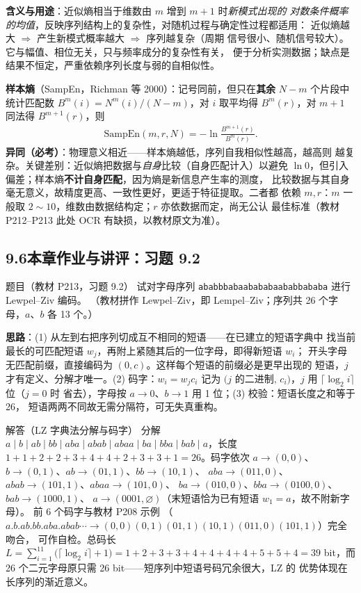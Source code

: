 \textbf{含义与用途}：近似熵相当于维数由 $m$ 增到 $m+1$ 时\emph{新模式出现的
对数条件概率的均值}，反映序列结构上的复杂性，对随机过程与确定性过程都适用：
近似熵越大 $\Rightarrow$ 产生新模式概率越大 $\Rightarrow$ 序列越复杂（周期
信号很小、随机信号较大）。它与幅值、相位无关，只与频率成分的复杂性有关，
便于分析实测数据；缺点是结果不恒定，严重依赖序列长度与弱的自相似性。

\textbf{样本熵}（SampEn，Richman 等 2000）：记号同前，但只在\textbf{其余}
$N-m$ 个片段中统计匹配数 $B^{m}(i)=N^{m}(i)/(N-m)$，对 $i$ 取平均得
$B^{m}(r)$，对 $m+1$ 同法得 $B^{m+1}(r)$，则
\begin{align*}
\mathrm{SampEn}(m,r,N)=-\ln\frac{B^{m+1}(r)}{B^{m}(r)} .
\end{align*}
\textbf{异同（必考）}：物理意义相近——样本熵越低，序列自我相似性越高，越高则
越复杂。关键差别：近似熵把数据与\emph{自身}比较（自身匹配计入）以避免
$\ln0$，但引入偏差；样本熵\textbf{不计自身匹配}，因为熵是新信息产生率的测度，
比较数据与其自身毫无意义，故精度更高、一致性更好，更适于特征提取。二者都
依赖 $m,r$：$m$ 一般取 $2\sim10$，维数由数据结构定；$r$ 亦依数据而定，尚无公认
最佳标准（教材 P212--P213 此处 OCR 有缺损，以教材原文为准）。

\subsection{9.6\quad 本章作业与讲评：习题 9.2}

\begin{example}{题目（教材 P213，习题 9.2）}
试对字母序列 \texttt{ababbbabaabababaababbababa} 进行 Lewpel--Ziv 编码。
（教材拼作 Lewpel--Ziv，即 Lempel--Ziv；序列共 26 个字母，$a$、$b$ 各 13 个。）
\end{example}

\textbf{思路}：(1) 从左到右把序列切成互不相同的短语——在已建立的短语字典中
找当前最长的可匹配短语 $w_j$，再附上紧随其后的一位字母，即得新短语 $w_i$；
开头字母无匹配前缀，直接编码为 $(0,c)$。这样每个短语的前缀必是更早出现的
短语，$j$ 才有定义、分解才唯一。(2) 码字：$w_i=w_jc_i$ 记为
$\bigl(j$ 的二进制$,\,c_i\bigr)$，$j$ 用 $\lceil\log_2i\rceil$ 位（$j=0$ 时
省去），字母按 $a\to0$、$b\to1$ 用 1 位；(3) 校验：短语长度之和等于 26，
短语两两不同故无需分隔符，可无失真重构。

\begin{keypoint}{解答（LZ 字典法分解与码字）}
分解 $a\mid b\mid ab\mid bb\mid aba\mid abab\mid abaa\mid ba\mid bba\mid
bab\mid a$，长度 $1{+}1{+}2{+}2{+}3{+}4{+}4{+}2{+}3{+}3{+}1=26$。码字依次
$a\!\to\!(0,0)$、$b\!\to\!(0,1)$、$ab\!\to\!(01,1)$、$bb\!\to\!(10,1)$、
$aba\!\to\!(011,0)$、$abab\!\to\!(101,1)$、$abaa\!\to\!(101,0)$、
$ba\!\to\!(010,0)$、$bba\!\to\!(0100,0)$、$bab\!\to\!(1000,1)$、
$a\!\to\!(0001,\varnothing)$（末短语恰为已有短语 $w_1=a$，故不附新字母）。
前 6 个码字与教材 P208 示例
（$a.b.ab.bb.aba.abab\cdots\to(0,0)(0,1)(01,1)(10,1)(011,0)(101,1)$）完全吻合，
可作自检。总码长
$L=\sum_{i=1}^{11}\bigl(\lceil\log_2i\rceil+1\bigr)=1+2+3+3+4+4+4+4+5+5+4
=39$ bit，而 26 个二元字母原只需 26 bit——短序列中短语号码冗余很大，LZ 的
优势体现在长序列的渐近意义。
\end{keypoint}


